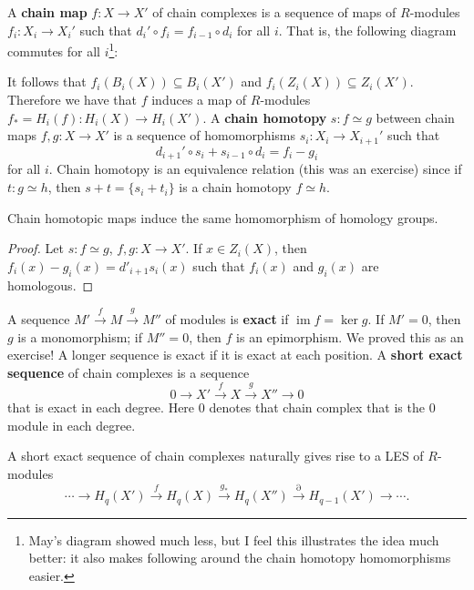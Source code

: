 \orbreak
A \textbf{chain map} $f \colon X \to X'$ of chain complexes is a sequence of maps of $R$-modules $f_i \colon X_i  \to X_i '$ such that $d_i '\circ f_i =f_{i-1}\circ d_i $ for all $i$. That is, the following diagram commutes for all $i$\footnote{May's diagram showed much less, but I feel this illustrates the idea much better: it also makes following around the chain homotopy homomorphisms easier.}:
\begin{figure}[H]
\centering
{}
\end{figure}
It follows that $f_i (B_i (X))\subseteq B_i (X')$ and $f_i (Z_i (X))\subseteq Z_i (X')$. Therefore we have that $f$ induces a map of $R$-modules $f_*=H_i (f) \colon H_i (X)\to H_i (X') $. A \textbf{chain homotopy} $s \colon f \simeq g $ between chain maps $f,g \colon X \to X'$ is a sequence of homomorphisms $s_i \colon X_i  \to X_{i+1}'$ such that \[
d_{i+1}'\circ s_i +s_{i-1}\circ d_i =f_i -g_i 
\] for all $i$. Chain homotopy is an equivalence relation (this was an exercise) since if $t \colon g \simeq h$, then $s+t=\{s_i +t_i \} $ is a chain homotopy $f \simeq h$.
\begin{lemma}
    Chain homotopic maps induce the same homomorphism of homology groups.
\end{lemma}
\begin{proof}
    Let $s \colon f \simeq g$, $f,g \colon X \to X'$. If $x\in Z_i (X)$, then $
        f_i (x)-g_i (x)=d'_{i+1}s_i (x)
$ such that $f_i (x)$ and $g_i (x)$ are homologous.
\end{proof}
\orbreak
A sequence $M' \overset{f}{\to } M \overset{g}{\to } M''$ of modules is \textbf{exact} if $\operatorname{im}f=\ker g$. If $M'=0$, then $g$ is a monomorphism; if $M''=0$, then $f$ is an epimorphism. We proved this as an exercise! A longer sequence is exact if it is exact at each position. A \textbf{short exact sequence} of chain complexes is a sequence \[
0\to X' \overset{f}{\to } X \overset{g}{\to } X''\to 0
\] that is exact in each degree. Here $0$ denotes that chain complex that is the $0$ module in each degree.
\begin{prop}
    A short exact sequence of chain complexes naturally gives rise to a LES of $R$-modules \[
        \cdots \to H_q(X')\overset{f}{\to} H_q(X)\overset{g_*}{\to } H_q(X'')\overset{\partial }{\to } H_{q-1}(X')\to \cdots .
    \] 
\end{prop}
